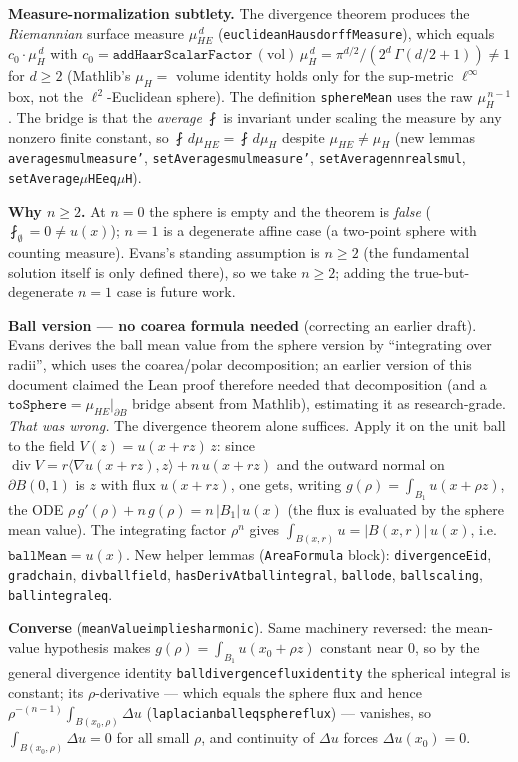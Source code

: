 ﻿\documentclass[12pt, a4paper]{article}
\renewcommand{\_}{\origunderscore\allowbreak}
\theoremstyle{definition}
\theoremstyle{plain}
\begin{document}
\textbf{Measure-normalization subtlety.} The divergence theorem produces the \emph{Riemannian}
surface measure $\mu_{HE}^{\,d}$ (\texttt{euclideanHausdorffMeasure}), which equals
$c_0 \cdot \mu_H^{\,d}$ with $c_0 = \texttt{addHaarScalarFactor}\,(\mathrm{vol})\,\mu_H^{\,d}
= \pi^{d/2}/(2^d\,\Gamma(d/2+1)) \ne 1$ for $d \ge 2$ (Mathlib's $\mu_H = $ volume identity
holds only for the sup-metric $\ell^\infty$ box, not the $\ell^2$-Euclidean sphere). The
definition \texttt{sphereMean} uses the raw $\mu_H^{\,n-1}$. The bridge is that the \emph{average}
$\fint$ is invariant under scaling the measure by any nonzero finite constant, so
$\fint\,d\mu_{HE} = \fint\,d\mu_H$ despite $\mu_{HE} \ne \mu_H$ (new lemmas
\texttt{average\_smul\_measure'}, \texttt{setAverage\_smul\_measure'},
\texttt{setAverage\_nnreal\_smul}, \texttt{setAverage\_$\mu$HE\_eq\_$\mu$H}).

\textbf{Why $n \ge 2$.} At $n = 0$ the sphere is empty and the theorem is \emph{false}
($\fint_\emptyset = 0 \ne u(x)$); $n = 1$ is a degenerate affine case (a two-point sphere with
counting measure). Evans's standing assumption is $n \ge 2$ (the fundamental solution itself is
only defined there), so we take $n \ge 2$; adding the true-but-degenerate $n = 1$ case is future
work.

\textbf{Ball version --- no coarea formula needed} (correcting an earlier draft). Evans derives
the ball mean value from the sphere version by ``integrating over radii'', which uses the
coarea/polar decomposition; an earlier version of this document claimed the Lean proof therefore
needed that decomposition (and a $\texttt{toSphere} = \mu_{HE}|_{\partial B}$ bridge absent from
Mathlib), estimating it as research-grade. \emph{That was wrong.} The divergence theorem alone
suffices. Apply it on the unit ball to the field $V(z) = u(x + r z)\,z$: since
$\operatorname{div}V = r\langle\nabla u(x+rz),z\rangle + n\,u(x+rz)$ and the outward normal on
$\partial B(0,1)$ is $z$ with flux $u(x+rz)$, one gets, writing $g(\rho) = \int_{B_1}u(x+\rho z)$,
the ODE $\rho\,g'(\rho) + n\,g(\rho) = n\,|B_1|\,u(x)$ (the flux is evaluated by the sphere mean
value). The integrating factor $\rho^{n}$ gives $\int_{B(x,r)}u = |B(x,r)|\,u(x)$, i.e.\
$\texttt{ballMean} = u(x)$. New helper lemmas (\texttt{AreaFormula} block): \texttt{divergenceE\_id},
\texttt{grad\_chain}, \texttt{div\_ball\_field}, \texttt{hasDerivAt\_ball\_integral},
\texttt{ball\_ode}, \texttt{ball\_scaling}, \texttt{ball\_integral\_eq}.

\textbf{Converse} (\texttt{meanValue\_implies\_harmonic}). Same machinery reversed: the mean-value
hypothesis makes $g(\rho) = \int_{B_1}u(x_0+\rho z)$ constant near $0$, so by the general
divergence identity \texttt{ball\_divergence\_flux\_identity} the spherical integral is constant;
its $\rho$-derivative --- which equals the sphere flux and hence $\rho^{-(n-1)}\int_{B(x_0,\rho)}
\Delta u$ (\texttt{laplacian\_ball\_eq\_sphere\_flux}) --- vanishes, so $\int_{B(x_0,\rho)}\Delta u
= 0$ for all small $\rho$, and continuity of $\Delta u$ forces $\Delta u(x_0) = 0$.
\end{document}
